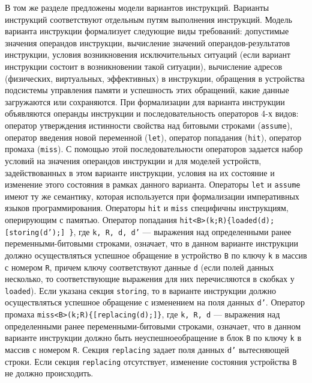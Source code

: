 \documentclass[14pt,autoref,href
,facsimile
]{disser}
\begin{document}
В том же разделе предложены модели вариантов инструкций. Варианты инструкций соответствуют отдельным путям выполнения инструкций. Модель варианта инструкции формализует следующие виды требований: допустимые значения операндов инструкции, вычисление значений операндов-результатов инструкции, условия возникновения исключительных ситуаций (если вариант инструкции состоит в возникновении такой ситуации), вычисление адресов (физических, виртуальных, эффективных) в инструкции, обращения в устройства подсистемы управления памяти и успешность этих обращений, какие данные загружаются или сохраняются. При формализации для варианта инструкции объявляются операнды инструкции и последовательность операторов 4-х видов: оператор утверждения истинности свойства над битовыми строками (\texttt{assume}), оператор введения новой переменной (\texttt{let}), оператор попадания (\texttt{hit}), оператор промаха (\texttt{miss}). С помощью этой последовательности операторов задается набор условий на значения операндов инструкции и для моделей устройств, задействованных в этом варианте инструкции, условия на их состояние и изменение этого состояния в рамках данного варианта. Операторы \texttt{let} и \texttt{assume} имеют ту же семантику, которая используется при формализации императивных языков программирования. Операторы \texttt{hit} и \texttt{miss} специфичны инструкциям, оперирующим с памятью. Оператор попадания \texttt{hit<B>(k;R)\{loaded(d); [storing(d');] \}}, где \texttt{k, R, d, d'} --- выражения над определенными ранее переменными-битовыми строками, означает, что в данном варианте инструкции должно осуществляться успешное обращение в устройство \texttt{B} по ключу \texttt{k} в массив с номером \texttt{R}, причем ключу соответствуют данные \texttt{d} (если полей данных несколько, то соответствующие выражения для них перечисляются в скобках у \texttt{loaded}). Если указана секция \texttt{storing}, то в варианте инструкции должно осуществляться успешное обращение с изменением на поля данных \texttt{d'}. Оператор промаха \texttt{miss<B>(k;R)\{[replacing(d);]\}}, где \texttt{k, R, d} --- выражения над определенными ранее переменными-битовыми строками, означает, что в данном варианте инструкции должно быть неуспешноеобращение в блок \texttt{B} по ключу \texttt{k} в массив с номером \texttt{R}. Секция \texttt{replacing} задает поля данных \texttt{d'} вытесняющей строки. Если секция \texttt{replacing} отсутствует, изменение состояния устройства \texttt{B} не должно происходить.
\end{document}
